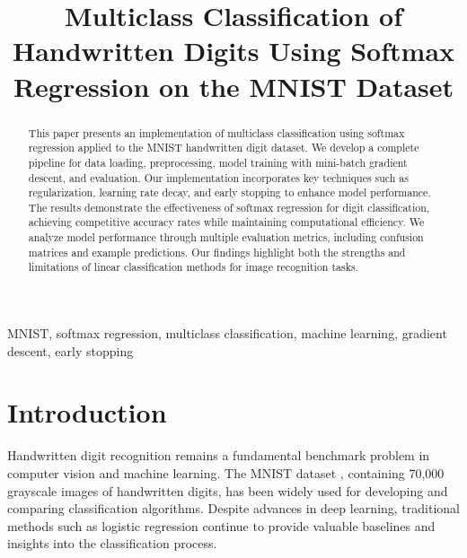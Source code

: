 \documentclass[10pt,journal,compsoc]{IEEEtran}
\begin{document}
\title{Multiclass Classification of Handwritten Digits Using Softmax Regression on the MNIST Dataset}

\author{
}

\maketitle

\begin{abstract}
This paper presents an implementation of multiclass classification using softmax regression applied to the MNIST handwritten digit dataset. We develop a complete pipeline for data loading, preprocessing, model training with mini-batch gradient descent, and evaluation. Our implementation incorporates key techniques such as regularization, learning rate decay, and early stopping to enhance model performance. The results demonstrate the effectiveness of softmax regression for digit classification, achieving competitive accuracy rates while maintaining computational efficiency. We analyze model performance through multiple evaluation metrics, including confusion matrices and example predictions. Our findings highlight both the strengths and limitations of linear classification methods for image recognition tasks.
\end{abstract}

\begin{IEEEkeywords}
MNIST, softmax regression, multiclass classification, machine learning, gradient descent, early stopping
\end{IEEEkeywords}

\section{Introduction}
Handwritten digit recognition remains a fundamental benchmark problem in computer vision and machine learning. The MNIST dataset \cite{lecun1998gradient}, containing 70,000 grayscale images of handwritten digits, has been widely used for developing and comparing classification algorithms. Despite advances in deep learning, traditional methods such as logistic regression continue to provide valuable baselines and insights into the classification process.
\end{document}
